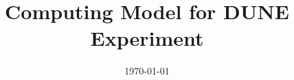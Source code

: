 \documentclass[12pt]{article}
\begin{document}

\title{Computing Model for DUNE Experiment}

\date{\today}


\maketitle





\newpage
%

\newpage
\tableofcontents
\newpage
\listoftables
\newpage
\listoffigures


\newpage


\newpage


\newpage


\newpage


\newpage



\newpage


\newpage


\newpage

\end{document}
